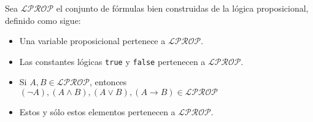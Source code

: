 \documentclass[12pt, a4paper]{exam}
\begin{document}
{\begin{multicols}{2}
    Sea $\mathcal{LPROP}$ el conjunto de fórmulas bien construidas de la 
    lógica proposicional, definido como sigue: 
    \begin{itemize}
        \item Una variable proposicional pertenece a $\mathcal{LPROP}$. 
        \item Las constantes lógicas \texttt{true} y \texttt{false} 
        pertenecen a $\mathcal{LPROP}$. 
        \item Si $A, B \in \mathcal{LPROP}$, entonces $(\lnot A), (A \land B), 
          (A \lor B), (A \rightarrow B) \in \mathcal{LPROP}$
        \item Estos y sólo estos elementos pertenecen a $\mathcal{LPROP}$.
    \end{itemize}
    \end{multicols}
    }
\end{document}

